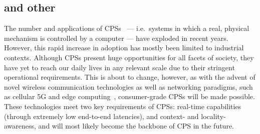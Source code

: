 %
%

\subsection{ and other }

The number and applications of \glspl{CPS}~\cite{Rajkumar2010CPS} --- i.e.\ systems in which a real, physical mechanism is controlled by a computer --- have exploded in recent years.
However, this rapid increase in adoption has mostly been limited to industrial contexts.
Although \glspl{CPS} present huge opportunities for all facets of society, they have yet to reach our daily lives in any relevant scale due to their stringent operational requirements.
This is about to change, however, as with the advent of novel wireless communication technologies as well as networking paradigms, such as cellular 5G and edge computing~\cite{Satya2017Emergence}, consumer-grade \glspl{CPS} will be made possible.
These technologies meet two key requirements of \glspl{CPS}: real-time capabilities (through extremely low end-to-end latencies), and context- and locality-awareness, and will most likely become the backbone of \gls{CPS} in the future.

